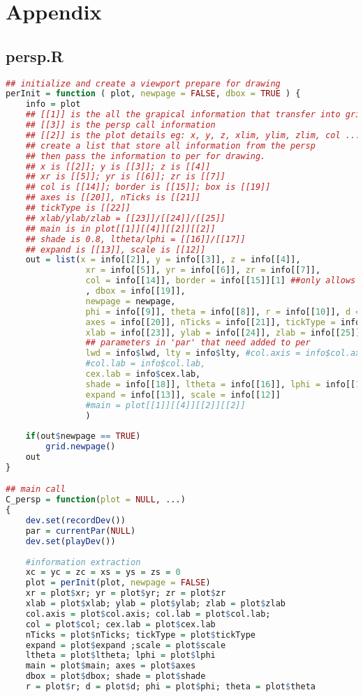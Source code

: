 \documentclass{report}
\begin{document}
\setlength{\parindent}{1pt}
\noindent


\newpage
\chapter{Appendix}
\section{persp.R}
\begin{lstlisting}[language = R]
## initialize and create a viewport prepare for drawing
perInit = function ( plot, newpage = FALSE, dbox = TRUE ) {
    info = plot
    ## [[1]] is the all the grapical information that transfer into grid
    ## [[3]] is the persp call information
    ## [[2]] is the plot details eg: x, y, z, xlim, ylim, zlim, col ...
    ## create a list that store all information from the persp
    ## then pass the information to per for drawing.
    ## x is [[2]]; y is [[3]]; z is [[4]]
    ## xr is [[5]]; yr is [[6]]; zr is [[7]]
    ## col is [[14]]; border is [[15]]; box is [[19]]
    ## axes is [[20]], nTicks is [[21]]
    ## tickType is [[22]]
    ## xlab/ylab/zlab = [[23]]/[[24]]/[[25]]
	## main is in plot[[1]][[4]][[2]][[2]]
    ## shade is 0.8, ltheta/lphi = [[16]]/[[17]]
    ## expand is [[13]], scale is [[12]]
    out = list(x = info[[2]], y = info[[3]], z = info[[4]],
                xr = info[[5]], yr = info[[6]], zr = info[[7]],
                col = info[[14]], border = info[[15]][1] ##only allows one color for border
				, dbox = info[[19]],
                newpage = newpage, 
                phi = info[[9]], theta = info[[8]], r = info[[10]], d = info[[11]],
                axes = info[[20]], nTicks = info[[21]], tickType = info[[22]],
                xlab = info[[23]], ylab = info[[24]], zlab = info[[25]],
				## parameters in 'par' that need added to per
                lwd = info$lwd, lty = info$lty, #col.axis = info$col.axis,
				#col.lab = info$col.lab, 
				cex.lab = info$cex.lab, 
                shade = info[[18]], ltheta = info[[16]], lphi = info[[17]],
                expand = info[[13]], scale = info[[12]]
				#main = plot[[1]][[4]][[2]][[2]]
                )
    
    if(out$newpage == TRUE)
        grid.newpage()
    out
}

## main call 
C_persp = function(plot = NULL, ...)
{
    dev.set(recordDev())
    par = currentPar(NULL)
    dev.set(playDev())
    
    #information extraction
    xc = yc = zc = xs = ys = zs = 0
    plot = perInit(plot, newpage = FALSE)
    xr = plot$xr; yr = plot$yr; zr = plot$zr
    xlab = plot$xlab; ylab = plot$ylab; zlab = plot$zlab
    col.axis = plot$col.axis; col.lab = plot$col.lab; 
    col = plot$col; cex.lab = plot$cex.lab
    nTicks = plot$nTicks; tickType = plot$tickType
    expand = plot$expand ;scale = plot$scale
    ltheta = plot$ltheta; lphi = plot$lphi
    main = plot$main; axes = plot$axes
    dbox = plot$dbox; shade = plot$shade
    r = plot$r; d = plot$d; phi = plot$phi; theta = plot$theta
	

\end{lstlisting}
\end{document}
